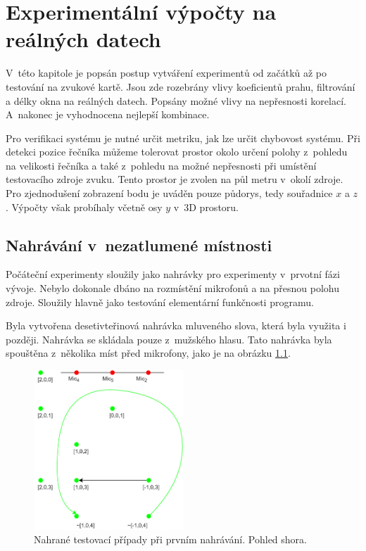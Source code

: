 \chapter{Experimentální výpočty na reálných datech}
\label{experimenty}

V~této kapitole je popsán postup vytváření experimentů od začátků až po testování na zvukové kartě. Jsou zde rozebrány vlivy koeficientů prahu, filtrování a délky okna na reálných datech. Popsány možné vlivy na nepřesnosti korelací. A~nakonec je vyhodnocena nejlepší kombinace.

Pro verifikaci systému je nutné určit metriku, jak lze určit chybovost systému. Při detekci pozice řečníka můžeme tolerovat prostor okolo určení polohy z~pohledu na velikosti řečníka a také z~pohledu na možné nepřesnosti při umístění testovacího zdroje zvuku. Tento prostor je zvolen na půl metru v~okolí zdroje. Pro zjednodušení zobrazení bodu je uváděn pouze půdorys, tedy souřadnice $x$ a $z$. Výpočty však probíhaly včetně osy $y$ v~3D prostoru. 

\section{Nahrávání v~nezatlumené místnosti}

Počáteční experimenty sloužily jako nahrávky pro experimenty v~prvotní fázi vývoje. Nebylo dokonale dbáno na rozmístění mikrofonů a na přesnou polohu zdroje. Sloužily hlavně jako testování elementární funkčnosti programu.

Byla vytvořena desetivteřinová nahrávka mluveného slova, která byla využita i později. Nahrávka se skládala pouze z~mužského hlasu. Tato nahrávka byla spouštěna z~několika míst před mikrofony, jako je na obrázku \ref{pic:testovacipripady}.

\begin{figure}[!ht]
	\centering
	\includegraphics[width=0.5\textwidth]{obrazky-figures/testovaci_pripady.png}
	\caption{Nahrané testovací případy při prvním nahrávání. Pohled shora.}
	\label{pic:testovacipripady}
\end{figure}

